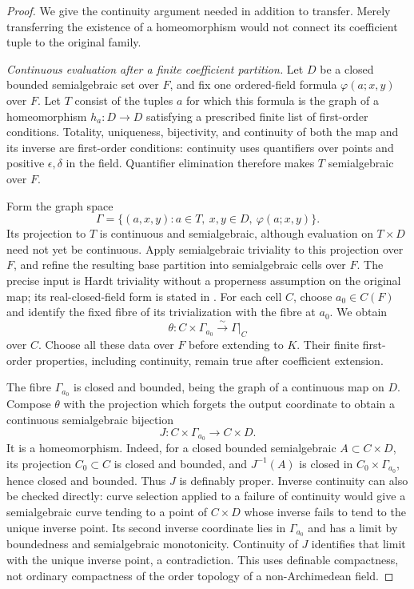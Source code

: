\begin{proof}
We give the continuity argument needed in addition to transfer.
Merely transferring the existence of a homeomorphism would not
connect its coefficient tuple to the original family.

\emph{Continuous evaluation after a finite coefficient partition.}
Let $D$ be a closed bounded semialgebraic set over $F$, and fix
one ordered-field formula $\varphi(a;x,y)$ over $F$. Let $T$
consist of the tuples $a$ for which this formula is the graph of
a homeomorphism $h_a:D\to D$ satisfying a prescribed finite
list of first-order conditions. Totality, uniqueness,
bijectivity, and continuity of both the map and its inverse are
first-order conditions: continuity uses quantifiers over points
and positive $\epsilon,\delta$ in the field. Quantifier
elimination therefore makes $T$ semialgebraic over $F$.

Form the graph space
\[
 \Gamma=\{(a,x,y):a\in T,\ x,y\in D,\ \varphi(a;x,y)\}.
\]
Its projection to $T$ is continuous and semialgebraic, although
evaluation on $T\times D$ need not yet be continuous. Apply
semialgebraic triviality to this projection over $F$, and refine
the resulting base partition into semialgebraic cells over $F$.
The precise input is Hardt triviality without a properness
assumption on the original map; its real-closed-field form is
stated in \cite[Section 2.2.1, p.~1296]{LerarioRizziTiberio2025}.
For each cell $C$, choose $a_0\in C(F)$ and identify the fixed
fibre of its trivialization with the fibre at $a_0$. We obtain
\[
 \theta:C\times\Gamma_{a_0}\xrightarrow{\ \sim\ }\Gamma|_C
\]
over $C$. Choose all these data over $F$ before extending to
$K$. Their finite first-order properties, including continuity,
remain true after coefficient extension.

The fibre $\Gamma_{a_0}$ is closed and bounded, being the graph
of a continuous map on $D$. Compose $\theta$ with the projection
which forgets the output coordinate to obtain a continuous
semialgebraic bijection
\[
 J:C\times\Gamma_{a_0}\longrightarrow C\times D.
\]
It is a homeomorphism. Indeed, for a closed bounded
semialgebraic $A\subset C\times D$, its projection
$C_0\subset C$ is closed and bounded, and $J^{-1}(A)$ is
closed in $C_0\times\Gamma_{a_0}$, hence closed and bounded.
Thus $J$ is definably proper. Inverse continuity can also be
checked directly: curve selection applied to a failure of
continuity would give a semialgebraic curve tending to a point
of $C\times D$ whose inverse fails to tend to the unique
inverse point. Its second inverse coordinate lies in
$\Gamma_{a_0}$ and has a limit by boundedness and semialgebraic
monotonicity. Continuity of $J$ identifies that limit with the
unique inverse point, a contradiction. This uses definable
compactness, not ordinary compactness of the order topology
of a non-Archimedean field.


\end{proof}
